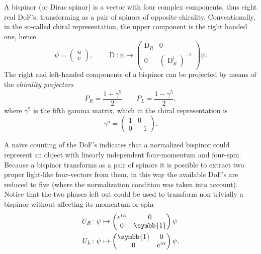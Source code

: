 A bispinor (or Dirac spinor) is a vector with four complex components, thus eight real DoF's, transforming as a pair of spinors of opposite chirality. Conventionally, in the so-called chiral representation, the upper component is the right handed one, hence 
\begin{equation}
  \psi = \begin{pmatrix} u \\ v \end{pmatrix}, \qquad \operatorname{D}\colon \psi \mapsto 
  \begin{pmatrix}
    \operatorname{D}_R & 0 \\
    0 & \left( \operatorname{D}^\dagger_R \right)^{-1} 
  \end{pmatrix} \psi .
\end{equation}
The right and left-handed components of a bispinor can be projected by means of the \emph{chirality projectors}
\begin{equation}
  P_R = \frac{1 + \gamma^5}{2} \qquad P_L = \frac{1 - \gamma^5}{2} ,
\end{equation}
where $\gamma^5$ is the fifth gamma matrix, which in the chiral representation is 
\begin{equation}
  \gamma^5 = \begin{pmatrix} 1 & 0 \\ 0 & -1 \end{pmatrix} .
\end{equation}

A naive counting of the DoF's indicates that a normalized bispinor could represent an object with linearly independent four-momentum and four-spin. Because a bispinor transforms as a pair of spinors it is possible to extract two proper light-like four-vectors from them, in this way the available DoF's are reduced to five (where the normalization condition was taken into account). Notice that the two phases left out could be used to transform non trivially a bispinor without affecting its momentum or spin
\begin{subequations}
  \begin{align}
    U_R \colon \psi &\mapsto \begin{pmatrix} e^{i \alpha} & 0 \\ 0 & \symbb{1} \end{pmatrix} \psi \\
    U_L \colon \psi &\mapsto \begin{pmatrix} \symbb{1} & 0 \\ 0 & e^{i \alpha} \end{pmatrix} \psi .
  \end{align}
  \label{eq:u1_chiral_transformations}
\end{subequations}

